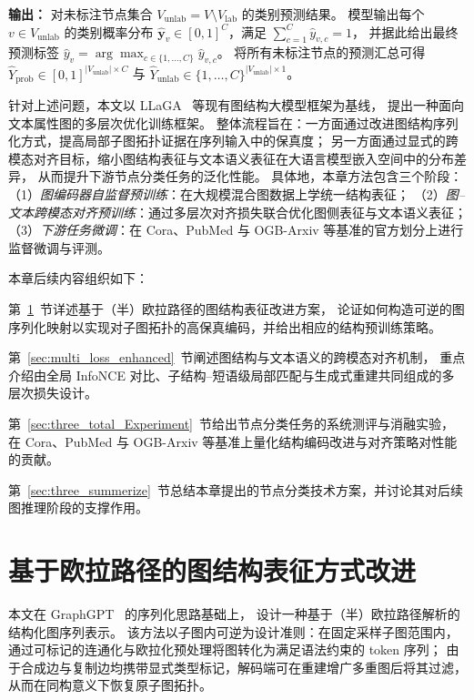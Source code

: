 \textbf{输出：}
对未标注节点集合 \(V_{\mathrm{unlab}}=V\setminus V_{\mathrm{lab}}\) 的类别预测结果。
模型输出每个 \(v\in V_{\mathrm{unlab}}\) 的类别概率分布
\(\hat{\mathbf{y}}_v\in[0,1]^C\)，满足 \(\sum_{c=1}^{C}\hat{y}_{v,c}=1\)，
并据此给出最终预测标签
\(\hat{y}_v=\arg\max_{c\in\{1,\dots,C\}}\hat{y}_{v,c}\)。
将所有未标注节点的预测汇总可得
\(\hat{Y}_{\mathrm{prob}}\in[0,1]^{|V_{\mathrm{unlab}}|\times C}\)
与
\(\hat{Y}_{\mathrm{unlab}}\in\{1,\dots,C\}^{|V_{\mathrm{unlab}}|\times 1}\)。

针对上述问题，本文以 LLaGA~\cite{Chen2024LLaGALL} 等现有图结构大模型框架为基线，
提出一种面向文本属性图的多层次优化训练框架。
整体流程旨在：一方面通过改进图结构序列化方式，提高局部子图拓扑证据在序列输入中的保真度；
另一方面通过显式的跨模态对齐目标，缩小图结构表征与文本语义表征在大语言模型嵌入空间中的分布差异，
从而提升下游节点分类任务的泛化性能。
具体地，本章方法包含三个阶段：
（1）\emph{图编码器自监督预训练}：在大规模混合图数据上学统一结构表征；
（2）\emph{图--文本跨模态对齐预训练}：通过多层次对齐损失联合优化图侧表征与文本语义表征；
（3）\emph{下游任务微调}：在 Cora\cite{Hu2020OpenGB}、PubMed\cite{Sen2008CollectiveCI} 与 OGB-Arxiv\cite{Hu2020OpenGB} 等基准的官方划分上进行监督微调与评测。

本章后续内容组织如下：

第~\ref{sec:graph_encoder_enhanced}~节详述基于（半）欧拉路径的图结构表征改进方案，
论证如何构造可逆的图序列化映射以实现对子图拓扑的高保真编码，并给出相应的结构预训练策略。

第~\ref{sec:multi_loss_enhanced}~节阐述图结构与文本语义的跨模态对齐机制，
重点介绍由全局 InfoNCE 对比、子结构--短语级局部匹配与生成式重建共同组成的多层次损失设计。

第~\ref{sec:three_total_Experiment}~节给出节点分类任务的系统测评与消融实验，
在 Cora\cite{Hu2020OpenGB}、PubMed\cite{Sen2008CollectiveCI} 与 OGB-Arxiv\cite{Hu2020OpenGB} 等基准上量化结构编码改进与对齐策略对性能的贡献。

第~\ref{sec:three_summerize}~节总结本章提出的节点分类技术方案，并讨论其对后续图推理阶段的支撑作用。


\section{基于欧拉路径的图结构表征方式改进}
\label{sec:graph_encoder_enhanced}

本文在 GraphGPT~\cite{Zhao2023GraphGPTGP} 的序列化思路基础上，
设计一种基于（半）欧拉路径解析的结构化图序列表示。
该方法以子图内可逆为设计准则：在固定采样子图范围内，
通过可标记的连通化与欧拉化预处理将图转化为满足语法约束的 token 序列；
由于合成边与复制边均携带显式类型标记，解码端可在重建增广多重图后将其过滤，
从而在同构意义下恢复原子图拓扑。

